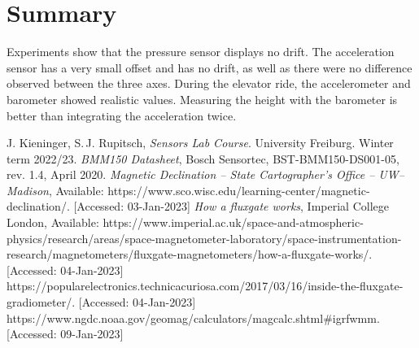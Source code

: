 \documentclass[DIV=14]{scrartcl}
\begin{document}
    \section{Summary}
    Experiments show that the pressure sensor displays no drift.
    The acceleration sensor has a very small offset and has no drift, as well as there were no difference observed
    between the three axes.
    During the elevator ride, the accelerometer and barometer showed realistic values.
    Measuring the height with the barometer is better than integrating the acceleration twice.


    \begin{thebibliography}{------}

         J. Kieninger, S.\,J. Rupitsch, \textit{Sensors Lab Course}.
        University Freiburg.
        Winter term 2022/23.
         \textit{BMM150 Datasheet}, Bosch Sensortec, BST-BMM150-DS001-05, rev. 1.4, April 2020.
         \textit{Magnetic Declination – State Cartographer's Office – UW–Madison},
        Available: https://www.sco.wisc.edu/learning-center/magnetic-declination/. [Accessed: 03-Jan-2023]
         \textit{How a fluxgate works}, Imperial College London,
        Available: https://www.imperial.ac.uk/space-and-atmospheric-physics/research/areas/space-magnetometer-laboratory/space-instrumentation-research/magnetometers/fluxgate-magnetometers/how-a-fluxgate-works/. [Accessed: 04-Jan-2023]
         https://popularelectronics.technicacuriosa.com/2017/03/16/inside-the-fluxgate-gradiometer/. [Accessed: 04-Jan-2023]
         https://www.ngdc.noaa.gov/geomag/calculators/magcalc.shtml#igrfwmm. [Accessed: 09-Jan-2023]
    \end{thebibliography}
\end{document}
